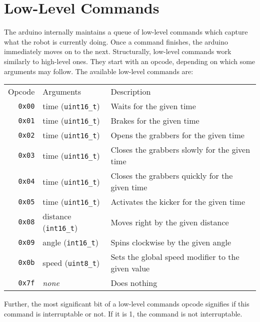 \section{Low-Level Commands}

The arduino internally maintains a queue of low-level commands which capture
what the robot is currently doing. Once a command finishes, the arduino
immediately moves on to the next. Structurally, low-level commands work
similarly to high-level ones. They start with an opcode, depending on which
some arguments may follow. The available low-level commands are:

\begin{tabularx}{\textwidth}{rlX}
    Opcode & Arguments & Description \\
    \texttt{0x00} & time (\verb$uint16_t$) &
        Waits for the given time \\
    \texttt{0x01} & time (\verb$uint16_t$) &
        Brakes for the given time \\
    \texttt{0x02} & time (\verb$uint16_t$) &
        Opens the grabbers for the given time \\
    \texttt{0x03} & time (\verb$uint16_t$) &
        Closes the grabbers slowly for the given time \\
    \texttt{0x04} & time (\verb$uint16_t$) &
        Closes the grabbers quickly for the given time \\
    \texttt{0x05} & time (\verb$uint16_t$) &
        Activates the kicker for the given time \\
    \texttt{0x08} & distance (\verb$int16_t$) &
        Moves right by the given distance \\
    \texttt{0x09} & angle (\verb$int16_t$) &
        Spins clockwise by the given angle \\
    \texttt{0x0b} & speed (\verb$uint8_t$) &
        Sets the global speed modifier to the given value \\
    \texttt{0x7f} & \textit{none} & Does nothing \\
\end{tabularx}

Further, the most significant bit of a low-level commands opcode signifies if this command is interruptable or not. If it is 1, the command is not interruptable.

